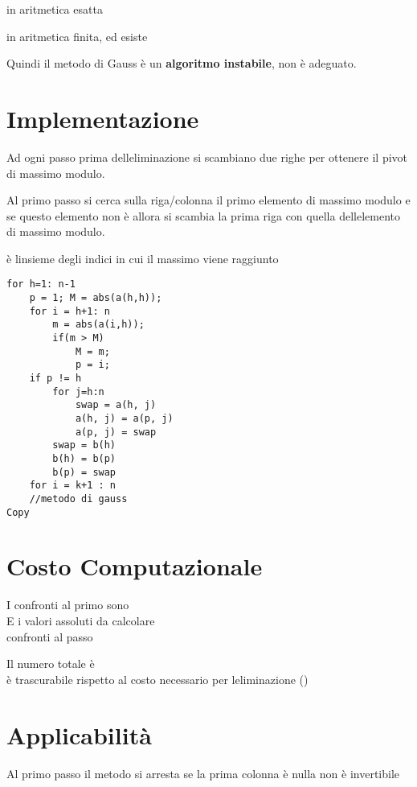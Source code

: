 \documentclass[
]{article}
\begin{document}
{} in aritmetica esatta

{} in aritmetica finita, ed esiste {}

Quindi il metodo di Gauss è un \textbf{algoritmo instabile}, non è
adeguato.

\hypertarget{implementazione}{%
\section{Implementazione}\label{implementazione}}

Ad ogni passo prima dell\textquotesingle eliminazione si scambiano due
righe per ottenere il pivot di massimo modulo.

Al primo passo si cerca sulla riga/colonna il primo elemento di massimo
modulo e se questo elemento non è {} allora si scambia la prima riga con
quella dell\textquotesingle elemento di massimo modulo.

{} è l\textquotesingle insieme degli indici in cui il massimo viene
raggiunto

\begin{verbatim}
for h=1: n-1
    p = 1; M = abs(a(h,h));
    for i = h+1: n
        m = abs(a(i,h));
        if(m > M)
            M = m;
            p = i;
    if p != h
        for j=h:n
            swap = a(h, j)
            a(h, j) = a(p, j)
            a(p, j) = swap
        swap = b(h)
        b(h) = b(p)
        b(p) = swap
    for i = k+1 : n
    //metodo di gauss
Copy
\end{verbatim}

\hypertarget{costo-computazionale}{%
\section{Costo Computazionale}\label{costo-computazionale}}

I confronti al primo {} sono\\
{}E i valori assoluti da calcolare\\
{}{} confronti al passo {}

Il numero totale è\\
{}{} è trascurabile rispetto al costo necessario per
l\textquotesingle eliminazione ({})

\hypertarget{applicabilituxe0}{%
\section{Applicabilità}\label{applicabilituxe0}}

Al primo passo il metodo si arresta se la prima colonna è nulla {} {}
non è invertibile {} {}
\end{document}
